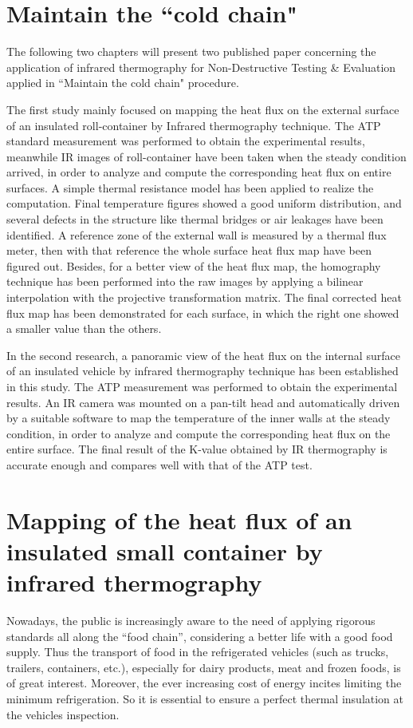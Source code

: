 \chapter*{Maintain the ``cold chain"}     %
The following two chapters will present two published paper concerning the application of infrared thermography for Non-Destructive Testing \& Evaluation applied in ``Maintain the cold chain" procedure.

The first study mainly focused on mapping the heat flux on the external surface of an insulated roll-container by Infrared thermography technique. The ATP standard measurement was performed to obtain the experimental results, meanwhile IR images of roll-container have been taken when the steady condition arrived, in order to analyze and compute the corresponding heat flux on entire surfaces. A simple thermal resistance model has been applied to realize the computation. Final temperature figures showed a good uniform distribution, and several defects in the structure like thermal bridges or air leakages have been identified. A reference zone of the external wall is measured by a thermal flux meter, then with that reference the whole surface heat flux map have been figured out. Besides, for a better view of the heat flux map, the homography technique has been performed into the raw images by applying a bilinear interpolation with the projective transformation matrix. The final corrected heat flux map has been demonstrated for each surface, in which the right one showed a smaller value than the others. 

In the second research, a panoramic view of the heat flux on the internal surface of an insulated vehicle by infrared thermography technique has been established in this study. The ATP measurement was performed to obtain the experimental results.  An IR camera was mounted on a pan-tilt head and automatically driven by a suitable software to map the temperature of the inner walls at the steady condition, in order to analyze and compute the corresponding heat flux on the entire surface.  The final result of the K-value obtained by IR thermography is accurate enough and compares well with that of the ATP test.

\chapter{Mapping of the heat flux of an insulated small container by infrared thermography}
Nowadays, the public is increasingly aware to the need of applying rigorous standards all along the ``food chain'', considering a better life with a good food supply.  Thus the transport of food in the refrigerated vehicles (such as trucks, trailers, containers, etc.), especially for dairy products, meat and frozen foods, is of great interest. Moreover, the ever increasing cost of energy incites limiting the minimum refrigeration. So it is essential to ensure a perfect thermal insulation at the vehicles inspection. 

